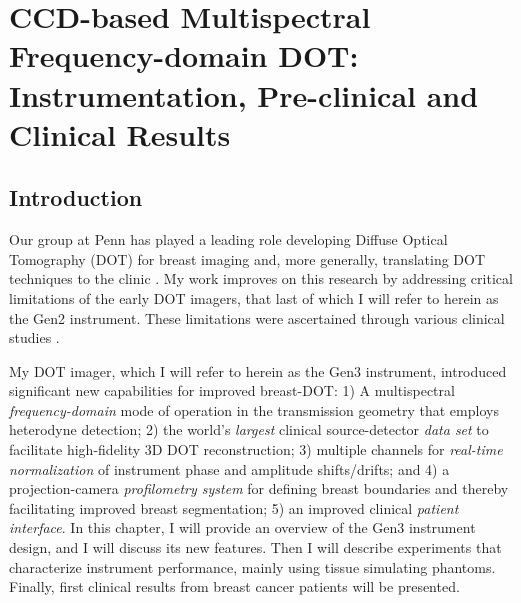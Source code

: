 \chapter{CCD-based Multispectral Frequency-domain DOT: Instrumentation, Pre-clinical and Clinical Results}
\label{Chap:4_Gen3}
\section{Introduction}
Our group at Penn has played a leading role developing Diffuse Optical Tomography (DOT) for breast imaging and, more generally, translating DOT techniques to the clinic \cite{Corlu2003,Culver2003a,Holboke2000,Ntziachristos1999,Ntziachristos2001,Ntziachristos2000,Ntziachristos2002,OLeary1996,Zhu1999}. My work improves on this research by addressing critical limitations of the early DOT imagers, that last of which I will refer to herein as the Gen2 instrument. These limitations were ascertained through various clinical studies \cite{Culver2003,Corlu2003,Corlu2005,Choe2005a,Corlu2007,Choe2009}.

My DOT imager, which I will refer to herein as the Gen3 instrument, introduced significant new capabilities for improved breast-DOT: 1) A multispectral \textit{frequency-domain} mode of operation in the transmission geometry that employs heterodyne detection; 2) the world's \textit{largest} clinical source-detector \textit{data set} to facilitate high-fidelity 3D DOT reconstruction; 3) multiple channels for \textit{real-time normalization} of instrument phase and amplitude shifts/drifts; and  4) a projection-camera \textit{profilometry system} for defining breast boundaries and thereby facilitating improved breast segmentation; 5) an improved clinical \textit{patient interface}. In this chapter, I will provide an overview of the Gen3 instrument design, and I will discuss  its new features. Then I will describe experiments that characterize instrument performance, mainly using tissue simulating phantoms. Finally, first clinical results from breast cancer patients will be presented.

